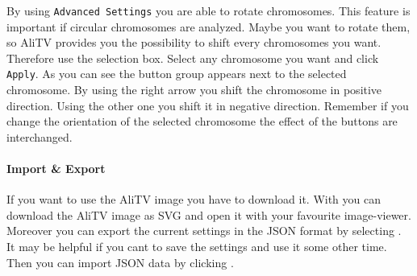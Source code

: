 \documentclass[a4paper]{scrartcl}
\begin{document}
By using \texttt{Advanced Settings} you are able to rotate chromosomes. This feature is important if circular chromosomes are analyzed. Maybe you want to rotate them, so AliTV provides you the possibility to shift every chromosomes you want. Therefore use the selection box. Select any chromosome you want and click \texttt{Apply}. As you can see the button group appears next to the selected chromosome. By using the right arrow you shift the chromosome in positive direction. Using the other one you shift it in negative direction. Remember if you change the orientation of the selected chromosome the effect of the buttons are interchanged.

\paragraph*{Import \& Export}
If you want to use the AliTV image you have to download it. With  you can download the AliTV image as SVG and open it with your favourite image-viewer. Moreover you can export the current settings in the JSON format by selecting . It may be helpful if you cant to save the settings and use it some other time. Then you can import JSON data by clicking .
\end{document}
